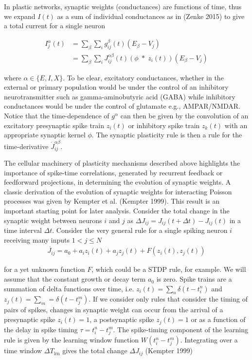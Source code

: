 \documentclass{ucetd}
\begin{document}
In plastic networks, synaptic weights (conductances) are functions of time, thus we expand $I(t)$ as a sum of individual conductances as in (Zenke 2015) to give a total current for a single neuron

\begin{align*}
I_{j}^{\alpha}(t) &= \sum_{\beta}\sum_{i} g_{ij}^{\beta}(t)(E_{\beta} - V_{j})\\
&= \sum_{\beta}\sum_{i}J_{ij}^{\alpha\beta}(t)\left(\phi\;*\;z_{i}(t)\right)(E_{\beta} - V_{j})
\end{align*}

where $\alpha \in \{E,I,X\}$. To be clear, excitatory conductances, whether in the external or primary population would be under the control of an inhibitory neurotransmitter such as gamma-aminobutyric acid (GABA) while inhibitory conductances would be under the control of glutamate e.g., AMPAR/NMDAR. Notice that the time-dependence of $g^{\alpha}$ can then be given by the convolution of an excitatory presynaptic spike train $z_{i}(t)$ or inhibitory spike train $z_{k}(t)$ with an appropriate synaptic kernel $\phi$. The synaptic plasticity rule is then a rule for the time-derivative $\dot{J}^{\alpha\beta}_{ij}$.

The cellular machinery of plasticity mechanisms described above highlights the importance of spike-time correlations, generated by recurrent feedback or feedforward projections, in determining the evolution of synaptic weights. A classic derivation of the evolution of synaptic weights for interacting Poisson processes was given by Kempter et al. (Kempter 1999). This result is an important starting point for later analysis. Consider the total change in the synaptic weight between neurons $i$ and $j$ as $\Delta J_{ij} = J_{ij}(t+\Delta t) - J_{ij}(t)$ in a time interval $\Delta t$. Consider the very general rule for a single spiking neuron $i$ receiving many inputs $1 < j \leq N$ 
\begin{align*}
\dot{J_{ij}} = a_{0} + a_{i}z_{i}(t) + a_{j}z_{j}(t) + F(z_{i}(t),z_{j}(t))
\end{align*}

for a yet unknown function $F$, which could be a STDP rule, for example. We will assume that the constant growth or decay term $a_{0}$ is zero. Spike trains are a summation of delta functions over time, i.e. $z_{i}(t) = \sum_{n} \delta(t-t_{i}^{n})$ and $z_{j}(t) = \sum_{m} = \delta(t-t_{j}^{m})$. If we consider only rules that consider the timing of pairs of spikes, changes in synaptic weight can occur from the arrival of a presynaptic spike $z_{i}(t) = 1$, a postsynaptic spike $z_{j}(t) = 1$ or as a function of the delay in spike timing  $\tau = t_{i}^{n} - t_{j}^{m}$. The spike-timing component of the learning rule is given by the learning window function $W(t_{i}^{n} - t_{j}^{m})$. Integrating over a time window $\Delta T_{\mathrm{lrn}}$ gives the total change $\Delta J_{ij}$ (Kempter 1999)
\end{document}
